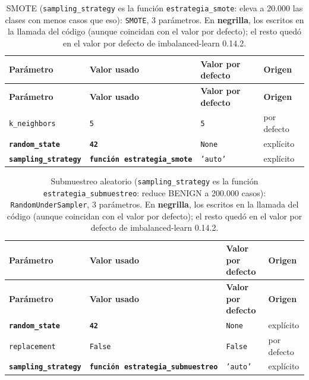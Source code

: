 \begin{longtable}{L{3.9cm} L{3.7cm} L{3.0cm} L{2.4cm}}
\caption{SMOTE (\texttt{sampling\_strategy} es la función \texttt{estrategia\_smote}: eleva a 20.000 las clases con menos casos que eso): \texttt{SMOTE}, 3 parámetros. En \textbf{negrilla}, los escritos en la llamada del código (aunque coincidan con el valor por defecto); el resto quedó en el valor por defecto de imbalanced-learn 0.14.2.}\label{tab:param-smote}\\
\toprule
\textbf{Parámetro} & \textbf{Valor usado} & \textbf{Valor por defecto} & \textbf{Origen} \\
\midrule
\endfirsthead
\toprule
\textbf{Parámetro} & \textbf{Valor usado} & \textbf{Valor por defecto} & \textbf{Origen} \\
\midrule
\endhead
\bottomrule
\endfoot
\texttt{k\_neighbors} & \texttt{5} & \texttt{5} & por defecto \\
\textbf{\texttt{random\_state}} & \textbf{\texttt{42}} & \texttt{None} & explícito \\
\textbf{\texttt{sampling\_strategy}} & \textbf{\texttt{función}\allowbreak\ \texttt{estrategia\_smote}} & \texttt{'auto'} & explícito \\
\end{longtable}

\begin{longtable}{L{3.9cm} L{3.7cm} L{3.0cm} L{2.4cm}}
\caption{Submuestreo aleatorio (\texttt{sampling\_strategy} es la función \texttt{estrategia\_submuestreo}: reduce BENIGN a 200.000 casos): \texttt{RandomUnderSampler}, 3 parámetros. En \textbf{negrilla}, los escritos en la llamada del código (aunque coincidan con el valor por defecto); el resto quedó en el valor por defecto de imbalanced-learn 0.14.2.}\label{tab:param-rus}\\
\toprule
\textbf{Parámetro} & \textbf{Valor usado} & \textbf{Valor por defecto} & \textbf{Origen} \\
\midrule
\endfirsthead
\toprule
\textbf{Parámetro} & \textbf{Valor usado} & \textbf{Valor por defecto} & \textbf{Origen} \\
\midrule
\endhead
\bottomrule
\endfoot
\textbf{\texttt{random\_state}} & \textbf{\texttt{42}} & \texttt{None} & explícito \\
\texttt{replacement} & \texttt{False} & \texttt{False} & por defecto \\
\textbf{\texttt{sampling\_strategy}} & \textbf{\texttt{función}\allowbreak\ \texttt{estrategia\_submuestreo}} & \texttt{'auto'} & explícito \\
\end{longtable}

